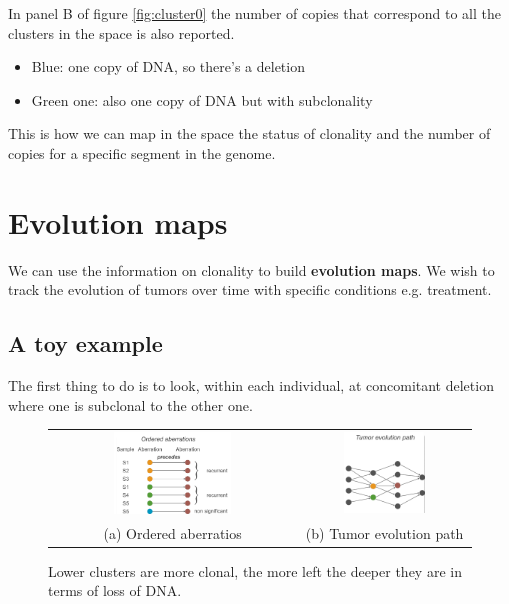In panel B of figure \ref{fig:cluster0} the number of copies that correspond to all the clusters in the space is also reported.

\begin{itemize}
\item Blue: one copy of DNA, so there's a deletion
\item Green one: also one copy of DNA but with subclonality
\end{itemize}

This is how we can map in the space the status of clonality and the number of copies for a specific segment in the genome.


\section{Evolution maps}
We can use the information on clonality to build \textbf{evolution maps}. We wish to track the evolution of tumors over time with specific conditions e.g. treatment.

\subsection{A toy example}
The first thing to do is to look, within each individual, at concomitant deletion where one is subclonal to the other one.

\begin{figure}[H]
\begin{tabular}{cc}
  \includegraphics[width=0.5\textwidth]{image4.png} &   \includegraphics[width=0.5\textwidth]{image5.png} \\
(a) Ordered aberratios & (b) Tumor evolution path \\[6pt]
\end{tabular}
\caption{Lower clusters are more clonal, the more left the deeper they are in terms of loss of DNA.}
\label{fig:evolution}
\end{figure}

